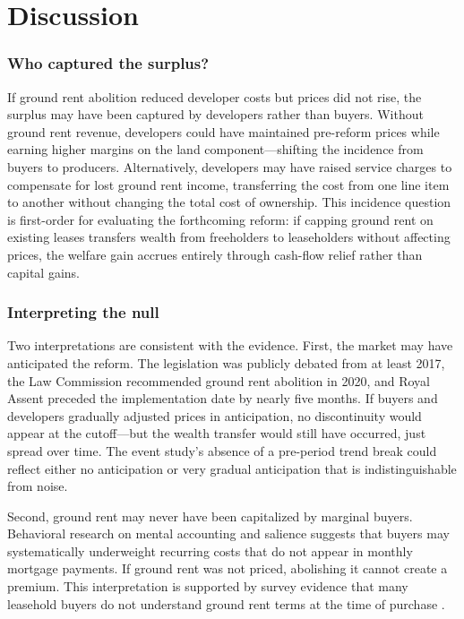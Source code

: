 \documentclass[12pt]{article}
\begin{document}
\section{Discussion}

\subsubsection*{Who captured the surplus?} If ground rent abolition reduced developer costs but prices did not rise, the surplus may have been captured by developers rather than buyers. Without ground rent revenue, developers could have maintained pre-reform prices while earning higher margins on the land component---shifting the incidence from buyers to producers. Alternatively, developers may have raised service charges to compensate for lost ground rent income, transferring the cost from one line item to another without changing the total cost of ownership. This incidence question is first-order for evaluating the forthcoming reform: if capping ground rent on existing leases transfers wealth from freeholders to leaseholders without affecting prices, the welfare gain accrues entirely through cash-flow relief rather than capital gains.

\subsubsection*{Interpreting the null} Two interpretations are consistent with the evidence. First, the market may have anticipated the reform. The legislation was publicly debated from at least 2017, the Law Commission recommended ground rent abolition in 2020, and Royal Assent preceded the implementation date by nearly five months. If buyers and developers gradually adjusted prices in anticipation, no discontinuity would appear at the cutoff---but the wealth transfer would still have occurred, just spread over time. The event study's absence of a pre-period trend break could reflect either no anticipation or very gradual anticipation that is indistinguishable from noise.

Second, ground rent may never have been capitalized by marginal buyers. Behavioral research on mental accounting \citep{thaler1999mental} and salience \citep{chetty2009salience} suggests that buyers may systematically underweight recurring costs that do not appear in monthly mortgage payments. If ground rent was not priced, abolishing it cannot create a premium. This interpretation is supported by survey evidence that many leasehold buyers do not understand ground rent terms at the time of purchase \citep{mhclg2017}.
\end{document}
